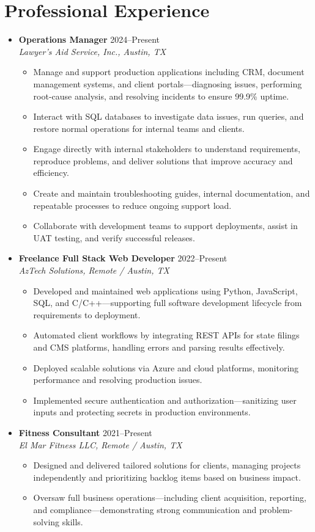 \documentclass[letterpaper,10pt]{article}
\newcommand{\resumeItem}[1]{\item \small{#1}}
\begin{document}
\section*{Professional Experience}
\begin{itemize}
  \item[]
    \textbf{Operations Manager} \hfill 2024--Present \\
    \textit{Lawyer's Aid Service, Inc., Austin, TX}
  \begin{itemize}
    \resumeItem{Manage and support production applications including CRM, document management systems, and client portals---diagnosing issues, performing root-cause analysis, and resolving incidents to ensure 99.9\% uptime.}
    \resumeItem{Interact with SQL databases to investigate data issues, run queries, and restore normal operations for internal teams and clients.}
    \resumeItem{Engage directly with internal stakeholders to understand requirements, reproduce problems, and deliver solutions that improve accuracy and efficiency.}
    \resumeItem{Create and maintain troubleshooting guides, internal documentation, and repeatable processes to reduce ongoing support load.}
    \resumeItem{Collaborate with development teams to support deployments, assist in UAT testing, and verify successful releases.}
  \end{itemize}

  \item[]
    \textbf{Freelance Full Stack Web Developer} \hfill 2022--Present \\
    \textit{AzTech Solutions, Remote / Austin, TX}
  \begin{itemize}
    \resumeItem{Developed and maintained web applications using Python, JavaScript, SQL, and C/C++---supporting full software development lifecycle from requirements to deployment.}
    \resumeItem{Automated client workflows by integrating REST APIs for state filings and CMS platforms, handling errors and parsing results effectively.}
    \resumeItem{Deployed scalable solutions via Azure and cloud platforms, monitoring performance and resolving production issues.}
    \resumeItem{Implemented secure authentication and authorization---sanitizing user inputs and protecting secrets in production environments.}
  \end{itemize}

  \item[]
    \textbf{Fitness Consultant} \hfill 2021--Present \\
    \textit{El Mar Fitness LLC, Remote / Austin, TX}
  \begin{itemize}
    \resumeItem{Designed and delivered tailored solutions for clients, managing projects independently and prioritizing backlog items based on business impact.}
    \resumeItem{Oversaw full business operations---including client acquisition, reporting, and compliance---demonstrating strong communication and problem-solving skills.}
  \end{itemize}
\end{itemize}
\end{document}
